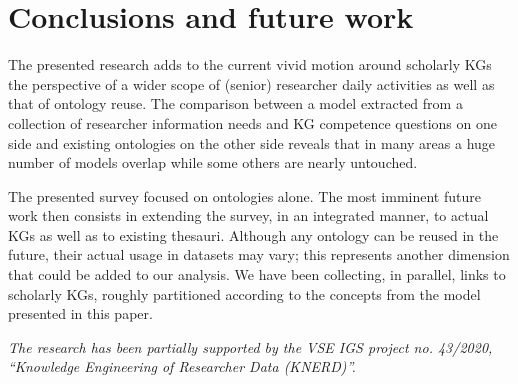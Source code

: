 
\section{Conclusions and future work}
\label{section:5}

The presented research adds to the current vivid motion around scholarly KGs the perspective of a wider scope of (senior) researcher daily activities as well as that of ontology reuse.
The comparison between a model extracted from a collection of researcher information needs and KG competence questions on one side and existing ontologies on the other side reveals that in many areas a huge number of models overlap while some others are nearly untouched.

The presented survey focused on ontologies alone.
The most imminent future work then consists in extending the survey, in an integrated manner, to actual KGs as well as to existing thesauri. 
Although any   ontology can be reused in the future, their actual usage in datasets may vary; this represents another dimension that could be added to our analysis.
We have been collecting, in parallel, links to scholarly KGs, roughly partitioned according to the concepts from the model presented in this paper. 

\medskip
\noindent
\emph{The research has been partially supported by the VSE IGS project no. 43/2020, ``Knowledge Engineering of Researcher Data (KNERD)''.}
